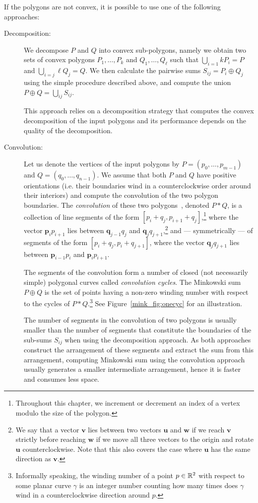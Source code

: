 If the polygons are not convex, it is possible to use one of the following
approaches:
\begin{description}
\item[Decomposition:]
We decompose $P$ and $Q$ into convex sub-polygons, namely we obtain two
sets of convex polygons $P_1, \ldots, P_k$ and $Q_1, \ldots, Q_\ell$ such
that $\bigcup_{i = 1}{k}{P_i} = P$ and $\bigcup_{i = j}{\ell}{Q_j} = Q$.
We then calculate the pairwise sums $S_{ij} = P_i \oplus Q_j$ using the
simple procedure described above, and compute the union $P \oplus Q =
\bigcup_{ij}{S_{ij}}$.

This approach relies on a decomposition strategy that computes the convex
decomposition of the input polygons and its performance depends on the
quality of the decomposition.
%
\item[Convolution:]
Let us denote the vertices of the input polygons by
$P = \left( p_0, \ldots, p_{m-1} \right)$ and
$Q = \left( q_0, \ldots, q_{n-1} \right)$. We assume that both $P$ and $Q$
have positive orientations (i.e. their boundaries wind in a counterclockwise
order around their interiors) and compute the convolution of the two polygon
boundaries. The {\em convolution} of these two polygons~\cite{grs-kfcg-83},
denoted $P * Q$, is a collection of line segments of the form
$[p_i + q_j, p_{i+1} + q_j]$,\footnote{Throughout this chapter, we increment
or decrement an index of a vertex modulo the size of the polygon.}
where the vector ${\mathbf p_i p_{i+1}}$
lies between ${\mathbf q_{j-1} q_j}$ and ${\mathbf q_j
q_{j+1}}$,\footnote{We say that a vector ${\mathbf v}$ lies between
two vectors ${\mathbf u}$ and ${\mathbf w}$ if we reach ${\mathbf v}$ strictly
before reaching ${\mathbf w}$ if we move all three vectors to the origin
and rotate ${\mathbf u}$ counterclockwise. Note that this also covers
the case where ${\mathbf u}$ has the same direction as ${\mathbf v}$.} and
--- symmetrically --- of segments of the form $[p_i + q_j, p_i + q_{j+1}]$,
where the vector ${\mathbf q_j q_{j+1}}$ lies between
${\mathbf p_{i-1} p_i}$ and ${\mathbf p_i p_{i+1}}$.

The segments of the convolution form a number of closed (not
necessarily simple) polygonal curves called \emph{convolution
cycles}. The Minkowski sum $P \oplus Q$ is the set of points
having a non-zero winding number with respect to the cycles
of $P * Q$.\footnote{Informally speaking, the winding number of a point
$p \in \mathbb{R}^2$ with respect to some planar curve $\gamma$ is an
integer number counting how many times does $\gamma$ wind in a
counterclockwise direction around $p$.} See Figure~\ref{mink_fig:onecyc}
for an illustration.

The number of segments in the convolution of two polygons is usually
smaller than the number of segments that constitute the boundaries of the
sub-sums $S_{ij}$ when using the decomposition approach. As both approaches
construct the arrangement of these segments and extract the sum from this
arrangement, computing Minkowski sum using the convolution approach usually
generates a smaller intermediate arrangement, hence it is faster and
consumes less space.
\end{description}

